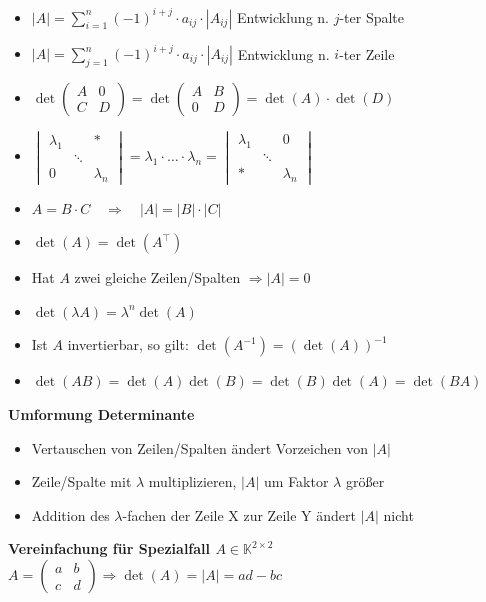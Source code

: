 \documentclass[6pt,a4paper]{scrartcl}
\begin{document}
\begin{multicols*}{4}
\begin{itemize}\itemsep0pt
\item $|A|=\sum\limits_{i=1}^n (-1)^{i+j} \cdot a_{ij} \cdot |A_{ij}|$ \qquad Entwicklung n. $j$-ter Spalte
\item $|A|=\sum\limits_{j=1}^n (-1)^{i+j} \cdot a_{ij} \cdot |A_{ij}|$ \qquad Entwicklung n. $i$-ter Zeile
\item $\det\begin{pmatrix}A&0\\C&D\end{pmatrix}=\det\begin{pmatrix}A&B\\0&D\end{pmatrix}=\det(A)\cdot\det(D)$
\item $\begin{vmatrix}\lambda_1&&* \\ &\ddots& \\ 0&&\lambda_n \end{vmatrix} = \lambda_1\cdot \ldots\cdot \lambda_n = \begin{vmatrix} \lambda_1&&0  \\  &\ddots& \\  *&&\lambda_n \end{vmatrix}$
\item $A=B \cdot C \quad \Rightarrow \quad |A|=|B| \cdot |C|$
\item $\det(A)=\det(A^\top)$
\item Hat $A$ zwei gleiche Zeilen/Spalten $\Rightarrow |A|=0$
\item $\det(\lambda A)=\lambda^n \det(A)$
\item Ist $A$ invertierbar, so gilt: $\det(A^{-1})=(\det(A))^{-1}$
\item $\det(AB) = \det(A) \det(B) = \det(B) \det(A) = \det(BA)$
\end{itemize}
\textbf{Umformung Determinante}
\begin{itemize}\itemsep0pt
\item Vertauschen von Zeilen/Spalten ändert Vorzeichen von $|A|$
\item Zeile/Spalte mit $\lambda$ multiplizieren, $|A|$ um Faktor $\lambda$ größer
\item Addition des $\lambda$-fachen der Zeile X zur Zeile Y ändert $|A|$ nicht 
\end{itemize}
\textbf{Vereinfachung für Spezialfall $A\in \mathbb K^{2\times 2}$}\\
$A=\begin{pmatrix}a&b\\c&d\end{pmatrix} \Rightarrow \det(A)=|A|=ad-bc$


\end{multicols*}
\end{document}
